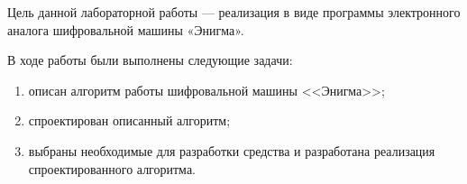 
Цель данной лабораторной работы --- реализация в виде программы электронного аналога шифровальной машины «Энигма».

В ходе работы были выполнены следующие задачи:
\begin{enumerate}
	\item описан алгоритм работы шифровальной машины <<Энигма>>;
	\item спроектирован описанный алгоритм;
	\item выбраны необходимые для разработки средства и разработана реализация спроектированного алгоритма.
\end{enumerate}